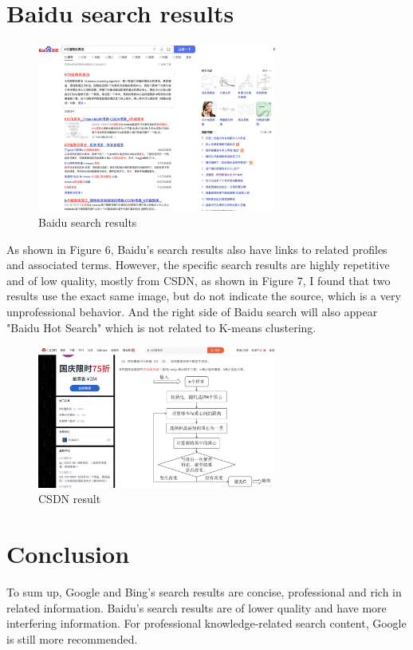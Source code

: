 \documentclass{article}
\begin{document}
    \section{Baidu search results}
    \begin{figure}[H]
        \centering
        \includegraphics[width=0.7\textwidth]{Baidu_home.png}
        \caption{Baidu search results}
    \end{figure}
    As shown in Figure 6, Baidu's search results also have links to related profiles and associated terms. However, the specific search results are highly repetitive and of low quality, mostly from CSDN, as shown in Figure 7, I found that two results use the exact same image, but do not indicate the source, which is a very unprofessional behavior. And the right side of Baidu search will also appear "Baidu Hot Search" which is not related to K-means clustering.
    \begin{figure}[ht]
        \centering
        \includegraphics[width=0.7\textwidth]{Baidu1.png}
        \caption{CSDN result}
    \end{figure}

    \section{Conclusion}
    To sum up, Google and Bing's search results are concise, professional and rich in related information. Baidu's search results are of lower quality and have more interfering information. For professional knowledge-related search content, Google is still more recommended.

    
    
\end{document}

